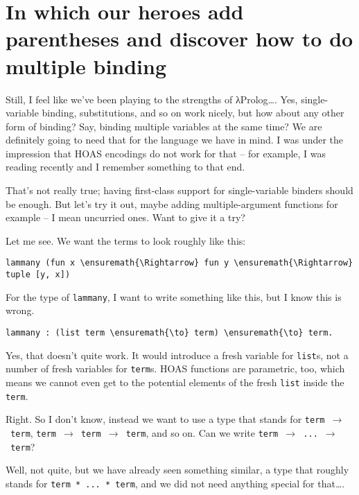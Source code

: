 \section{In which our heroes add parentheses and discover how to do
multiple
binding}\label{in-which-our-heroes-add-parentheses-and-discover-how-to-do-multiple-binding}

\heroSTUDENT{} Still, I feel like we've been playing to the strengths of
\foreignlanguage{greek}{λ}Prolog\ldots{}. Yes, single-variable binding, substitutions, and so on
work nicely, but how about any other form of binding? Say, binding
multiple variables at the same time? We are definitely going to need
that for the language we have in mind. I was under the impression that
HOAS encodings do not work for that -- for example, I was reading
\citet{keuchel2016needle} recently and I remember something to that end.

\heroADVISOR{} That's not really true; having first-class support for
single-variable binders should be enough. But let's try it out, maybe
adding multiple-argument functions for example -- I mean uncurried ones.
Want to give it a try?

\heroSTUDENT{} Let me see. We want the terms to look roughly like this:

\begin{verbatim}
lammany (fun x \ensuremath{\Rightarrow} fun y \ensuremath{\Rightarrow} tuple [y, x])
\end{verbatim}

For the type of \texttt{lammany}, I want to write something like this,
but I know this is wrong.

\begin{verbatim}
lammany : (list term \ensuremath{\to} term) \ensuremath{\to} term.
\end{verbatim}

\heroADVISOR{} Yes, that doesn't quite work. It would introduce a fresh
variable for \texttt{list}s, not a number of fresh variables for
\texttt{term}s. HOAS functions are parametric, too, which means we
cannot even get to the potential elements of the fresh \texttt{list}
inside the \texttt{term}.

\heroSTUDENT{} Right. So I don't know, instead we want to use a type that
stands for \texttt{term\ \ensuremath{\to}\ term},
\texttt{term\ \ensuremath{\to}\ term\ \ensuremath{\to}\ term}, and so on.
Can we write \texttt{term\ \ensuremath{\to}\ ...\ \ensuremath{\to}\ term}?

\heroADVISOR{} Well, not quite, but we have already seen something similar, a
type that roughly stands for \texttt{term\ *\ ...\ *\ term}, and we did
not need anything special for that\ldots{}.

